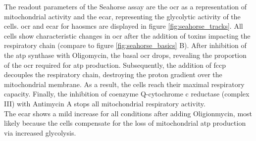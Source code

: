     The readout parameters of the Seahorse assay are the \ac{ocr} as a representation of mitochondrial activity and the \ac{ecar}, representing the glycolytic activity of the cells. \ac{ocr} and \ac{ecar} for \acp{haosmc} are displayed in figure \ref{fig:seahorse_tracks}. All cells show characteristic changes in \ac{ocr} after the addition of toxins impacting the respiratory chain (compare to figure \ref{fig:seahorse_basics} B). After inhibition of the \ac{atp} synthase with Oligomycin, the basal \ac{ocr} drops, revealing the proportion of the \ac{ocr} required for \ac{atp} production. Subsequently, the addition of \ac{fccp} decouples the respiratory chain, destroying the proton gradient over the mitochondrial membrane. As a result, the cells reach their maximal respiratory capacity. Finally, the inhibition of coenzyme Q-cytochrome c reductase (complex III) with Antimycin A stops all mitochondrial respiratory activity.\\
    The \ac{ecar} shows a mild increase for all conditions after adding Oligionmycin, most likely because the cells compensate for the loss of mitochondrial \ac{atp} production via increased glycolysis.

